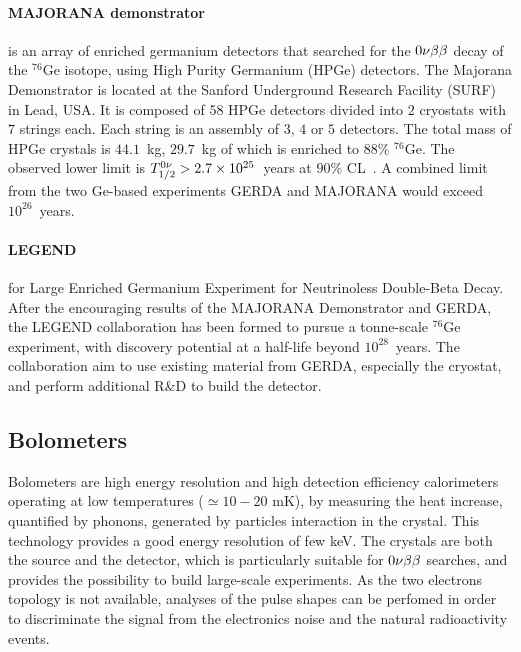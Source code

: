 \paragraph{MAJORANA demonstrator} is an array of enriched germanium detectors that searched for the $0\nu\beta\beta$ decay of the $^{76}$Ge isotope, using High Purity Germanium (HPGe) detectors.
The Majorana Demonstrator is located at the Sanford Underground Research Facility (SURF) in Lead, USA.
It is composed of $58$ HPGe detectors divided into $2$ cryostats with $7$ strings each.
Each string is an assembly of $3$, $4$ or $5$ detectors.
The total mass of HPGe crystals is $44.1$~kg, $29.7$~kg of which is enriched to $88$\% $^{76}$Ge.
The observed lower limit is $T_{1/2}^{0\nu}>2.7\times 10^{25}$~years at $90$\% CL~\cite{art:majorana2019}.
A combined limit from the two Ge-based experiments GERDA and MAJORANA would exceed $10^{26}$~years.

\paragraph{LEGEND} for Large Enriched Germanium Experiment for Neutrinoless Double-Beta Decay.
After the encouraging results of the MAJORANA Demonstrator and GERDA, the LEGEND collaboration has been formed to pursue a tonne-scale $^{76}$Ge experiment, with discovery potential at a half-life beyond $10^{28}$~years.
The collaboration aim to use existing material from GERDA, especially the cryostat, and perform additional R\&D to build the detector.

\subsection{Bolometers}
\label{subsec:bolometers}

Bolometers are high energy resolution and high detection efficiency calorimeters operating at low temperatures ($\simeq 10-20$ mK), by measuring the heat increase, quantified by phonons, generated by particles interaction in the crystal.
This technology provides a good energy resolution of few keV.
The crystals are both the source and the detector, which is particularly suitable for $0\nu\beta\beta$ searches, and provides the possibility to build large-scale experiments.
As the two electrons topology is not available, analyses of the pulse shapes can be perfomed in order to discriminate the signal from the electronics noise and the natural radioactivity events.


